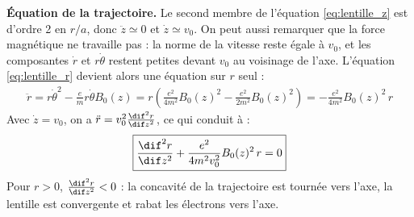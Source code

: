 \begin{correction}
\begin{enumerate}
	\medskip
	\textbf{Équation de la trajectoire.} Le second membre de l'équation \eqref{eq:lentille_z} est d'ordre 2 en $r/a$, donc $\ddot z\simeq0$ et $\dot z\simeq v_0$. On peut aussi remarquer que la force magnétique ne travaille pas : la norme de la vitesse reste égale à $v_0$, et les composantes $\dot r$ et $r\dot\theta$ restent petites devant $v_0$ au voisinage de l'axe. L'équation \eqref{eq:lentille_r} devient alors une équation sur $r$ seul :
	\begin{align*}
		\ddot r=r\dot\theta^2-\frac{e}{m}r\dot\theta B_0(z)=r\left(\frac{e^2}{4m^2}B_0(z)^2-\frac{e^2}{2m^2}B_0(z)^2\right)=-\frac{e^2}{4m^2}B_0(z)^2\,r
	\end{align*}
	Avec $\dot z=v_0$, on a $\ddot r=v_0^2\frac{\dif^2 r}{\dif z^2}$, ce qui conduit à :
	\begin{align*}
		\boxed{\frac{\dif^2 r}{\dif z^2}+\frac{e^2}{4m^2v_0^2}B_0(z)^2\,r=0}
	\end{align*}
	Pour $r>0$, $\frac{\dif^2 r}{\dif z^2}<0$ : la concavité de la trajectoire est tournée vers l'axe, la lentille est convergente et rabat les électrons vers l'axe.



\end{enumerate}
\end{correction}
